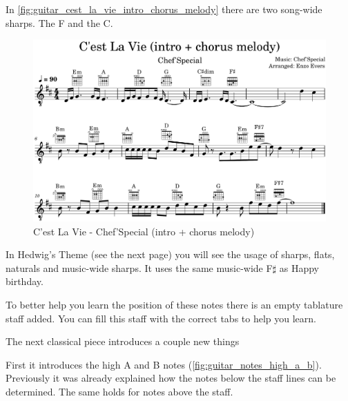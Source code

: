 In \autoref{fig:guitar_cest_la_vie_intro_chorus_melody} there are two song-wide sharps. The F and the C.

\begin{figure}[h]
	\centering
	\includegraphics[width=\textwidth]{../../MuseScore/Guitar/GuitarCestLaVieChefSpecial_IntroChorus.png}
	\caption{C'est La Vie - Chef'Special (intro + chorus melody)}
	\label{fig:guitar_cest_la_vie_intro_chorus_melody}
\end{figure}

In Hedwig's Theme (see the next page) you will see the usage of sharps, flats, naturals and music-wide sharps. It uses the same music-wide F$\sharp$ as Happy birthday.

To better help you learn the position of these notes there is an empty tablature staff added. You can fill this staff with the correct tabs to help you learn.



The next classical piece introduces a couple new things

First it introduces the high A and B notes (\autoref{fig:guitar_notes_high_a_b}). Previously it was already explained how the notes below the staff lines can be determined. The same holds for notes above the staff.


